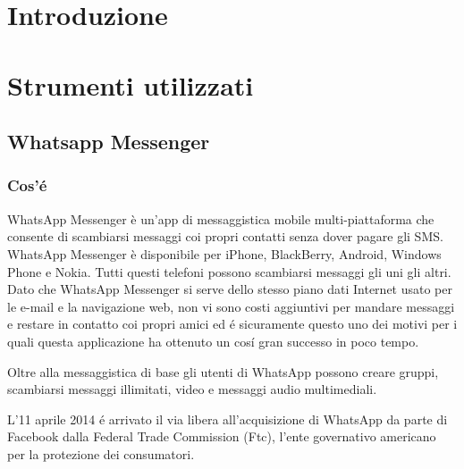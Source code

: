 \documentclass[a4paper,11pt]{book}
\begin{document}
\begin{frontespizio}
\end{frontespizio}


\tableofcontents

\chapter{Introduzione}


\chapter{Strumenti utilizzati}

\section{Whatsapp Messenger}
\subsection{Cos'\'e}
WhatsApp Messenger è un'app di messaggistica mobile multi-piattaforma che consente di scambiarsi messaggi coi propri contatti senza dover pagare gli SMS. WhatsApp Messenger è disponibile per iPhone, BlackBerry, Android, Windows Phone e Nokia. Tutti questi telefoni possono scambiarsi messaggi gli uni gli altri. Dato che WhatsApp Messenger si serve dello stesso piano dati Internet usato per le e-mail e la navigazione web, non vi sono costi aggiuntivi per mandare messaggi e restare in contatto coi propri amici ed \'e sicuramente questo uno dei motivi per i quali questa applicazione ha ottenuto un cos\'i gran successo in poco tempo.

Oltre alla messaggistica di base gli utenti di WhatsApp possono creare gruppi, scambiarsi messaggi illimitati, video e messaggi audio multimediali.

L'11 aprile 2014 \'e arrivato il via libera all'acquisizione di WhatsApp da parte di Facebook dalla Federal Trade Commission (Ftc), l'ente governativo americano per la protezione dei consumatori.

\end{document}
